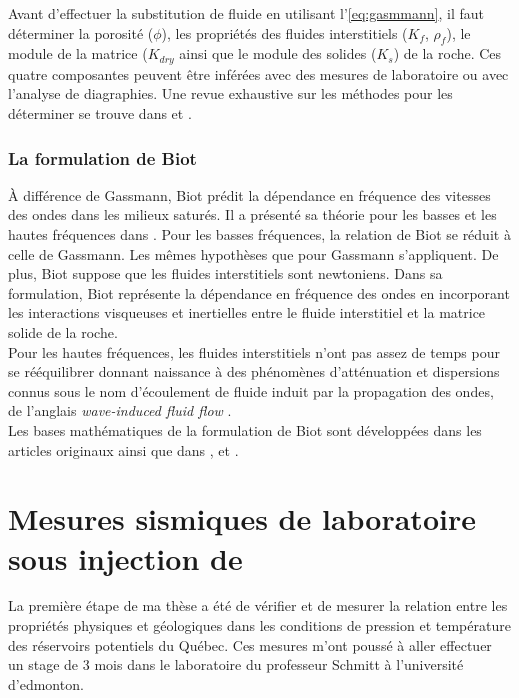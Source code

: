 Avant d'effectuer la substitution de fluide en utilisant l'\cref{eq:gasmmann}, il faut déterminer la porosité ($\phi$), les propriétés des fluides interstitiels ($K_f$, $\rho_f$), le module de la matrice ($K_{dry}$ ainsi que le module des solides ($K_s$) de la roche. Ces quatre composantes peuvent être inférées avec des mesures de laboratoire ou avec l'analyse de diagraphies. Une revue exhaustive sur les méthodes pour les déterminer se trouve dans \citet{Smith2003} et \citet{Mavko2009}.
\subsubsection{La formulation de Biot}
À différence de Gassmann, Biot prédit la dépendance en fréquence des vitesses des ondes dans les milieux saturés. Il a présenté sa théorie pour les basses et les hautes fréquences dans \citet{Biot1956a,Biot1956b}. Pour les basses fréquences, la relation de Biot se réduit à celle de Gassmann. Les mêmes hypothèses que pour Gassmann s'appliquent. De plus, Biot suppose que les fluides interstitiels sont newtoniens. Dans sa formulation, Biot représente la dépendance en fréquence des ondes en incorporant les interactions visqueuses et inertielles entre le fluide interstitiel et la matrice solide de la roche. \\
Pour les hautes fréquences, les fluides interstitiels n'ont pas assez de temps pour se rééquilibrer donnant naissance à des phénomènes d’atténuation et dispersions connus sous le nom d'écoulement de fluide induit par la propagation des ondes, de l'anglais \emph{wave-induced fluid flow} \citep{Muller2010}.\\
Les bases mathématiques de la formulation de Biot sont développées dans les articles originaux \citet{Biot1956a,Biot1956b} ainsi que dans \citet{Bourbie1986}, \citet{Carcione2007} et \citet{Allard2009}. 
\section{Mesures sismiques de laboratoire sous injection de \texorpdfstring{}{CO2}}
\label{sc:laboratoire}
La première étape de ma thèse a été de vérifier et de mesurer la relation entre les propriétés physiques et géologiques dans les conditions de pression et température des réservoirs potentiels du Québec. Ces mesures m'ont poussé à aller effectuer un stage de 3 mois dans le laboratoire du professeur Schmitt à l'université d'edmonton.

